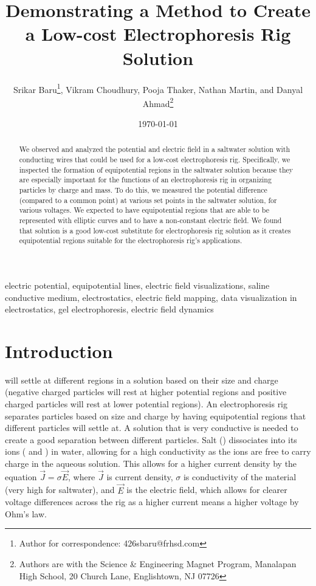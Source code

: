 ﻿\documentclass[10pt,journal,twoside]{IEEEtran}
\title{Demonstrating a Method to Create a Low-cost Electrophoresis Rig Solution\\}
\author{Srikar Baru\thanks{Author for correspondence: 426sbaru@frhsd.com}, Vikram Choudhury, Pooja Thaker, Nathan Martin, and Danyal Ahmad\thanks{Authors are with the Science \& Engineering Magnet Program, Manalapan High School, 20 Church Lane, Englishtown, NJ 07726}}
\date{\today}
\newcommand{\keywords}{electric potential, equipotential lines, electric field visualizations, saline conductive medium, electrostatics, electric field mapping, data visualization in electrostatics, gel electrophoresis, electric field dynamics}
\begin{document}
\maketitle

\begin{abstract}
We observed and analyzed the potential and electric field in a saltwater solution with conducting wires that could be used for a low-cost electrophoresis rig. Specifically, we inspected the formation of equipotential regions in the saltwater solution because they are especially important for the functions of an electrophoresis rig in organizing particles by charge and mass. To do this, we measured the potential difference (compared to a common point) at various set points in the saltwater solution, for various voltages. We expected to have equipotential regions that are able to be represented with elliptic curves and to have a non-constant electric field. We found that solution is a good low-cost substitute for electrophoresis rig solution as it creates equipotential regions suitable for the electrophoresis rig’s applications.
\end{abstract}

\begin{IEEEkeywords}
\keywords
\end{IEEEkeywords}


\section{Introduction}%
 will settle at different regions in a solution based on their size and charge (negative charged particles will rest at higher potential regions and positive charged particles will rest at lower potential regions). An electrophoresis rig separates particles based on size and charge by having equipotential regions that different particles will settle at. A solution that is very conductive is needed to create a good separation between different particles. Salt () dissociates into its ions ( and ) in water, allowing for a high conductivity as the ions are free to carry charge in the aqueous solution. This allows for a higher current density by the equation $\vec{J} = \sigma \vec{E}$, where $\vec{J}$ is current density, $\sigma$ is conductivity of the material (very high for saltwater), and $\vec{E}$ is the electric field, which allows for clearer voltage differences across the rig as a higher current means a higher voltage by Ohm’s law.  
\end{document}
